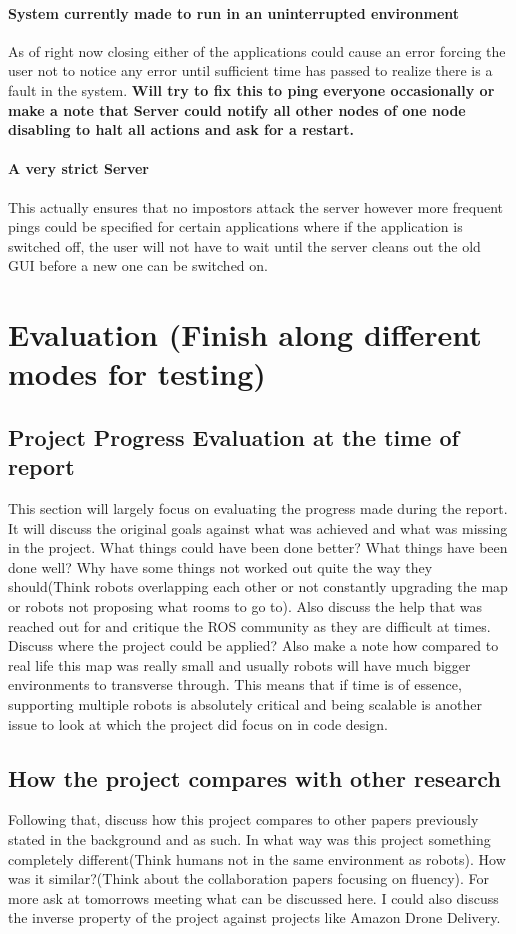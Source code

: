 \documentclass{report}
\begin{document}
      \subsubsection{System currently made to run in an uninterrupted environment}
        As of right now closing either of the applications could cause an error forcing the user not to notice any error until sufficient time has passed to realize there is a fault in the system. \textbf{Will try to fix this to ping everyone occasionally or make a note that Server could notify all other nodes of one node disabling to halt all actions and ask for a restart.}
      \subsubsection{A very strict Server}
        This actually ensures that no impostors attack the server however more frequent pings could be specified for certain applications where if the application is switched off, the user will not have to wait until the server cleans out the old GUI before a new one can be switched on.
  \chapter{Evaluation (Finish along different modes for testing)}
    \section{Project Progress Evaluation at the time of report}
      This section will largely focus on evaluating the progress made during the report. It will discuss the original goals against what was achieved and what was missing in the project. What things could have been done better? What things have been done well? Why have some things not worked out quite the way they should(Think robots overlapping each other or not constantly upgrading the map or robots not proposing what rooms to go to). Also discuss the help that was reached out for and critique the ROS community as they are difficult at times. Discuss where the project could be applied? Also make a note how compared to real life this map was really small and usually robots will have much bigger environments to transverse through. This means that if time is of essence, supporting multiple robots is absolutely critical and being scalable is another issue to look at which the project did focus on in code design.

    \section{How the project compares with other research}
      Following that, discuss how this project compares to other papers previously stated in the background and as such. In what way was this project something completely different(Think humans not in the same environment as robots). How was it similar?(Think about the collaboration papers focusing on fluency). For more ask at tomorrows meeting what can be discussed here. I could also discuss the inverse property of the project against projects like Amazon Drone Delivery.
\end{document}
